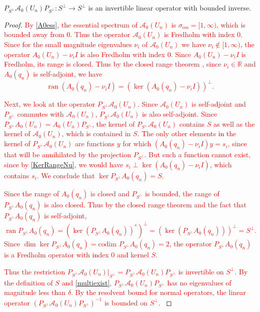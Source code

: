 \documentclass[review,onefignum,onetabnum]{siamart171218}
\newcommand{\R}{\mathbb{R}}
\def\dim{\mathop\mathrm{dim}\nolimits}
\def\ker{\mathop\mathrm{ker}\nolimits}
\def\Ran{\mathop\mathrm{ran}\nolimits}
\newcommand{\calA}{\mathcal{A}}
\newcommand{\revised}[1]{ \textcolor{red}{#1} }
\begin{document}

\begin{lemma}\label{PA0inv}
$P_{S^\perp} \calA_0(U_n) P_{S^\perp}: S^\perp \rightarrow S^\perp$ is an invertible linear operator with bounded inverse.
\end{lemma}

\begin{proof}
\revised{
By \cref{A0ess}, the essential spectrum of $\calA_0(U_n)$ is $\sigma_{\text{ess}} = [1, \infty)$, which is bounded away from 0.
Thus the operator $\calA_0(U_n)$ is Fredholm with index 0. Since for the small magnitude eigenvalues $\nu_i$ of $\calA_0(U_n)$ we have $\nu_i \notin [1, \infty)$, the operator $A_0(U_n)  - \nu_i I$ is also Fredholm with index 0. Since $A_0(U_n)  - \nu_i I$ is Fredholm, its range is closed. Thus by the closed range theorem \cite[p.~205]{Yosida}, since $\nu_i \in \R$ and $A_0(q_n)$ is self-adjoint, we have
\begin{equation}\label{KerRangeNu}
\Ran (A_0(q_n) - \nu_i I) = \left(\ker (A_0(q_n) - \nu_i I)\right)^\perp.
\end{equation}
}

\revised{
Next, we look at the operator $P_{S^\perp} \calA_0(U_n)$. Since $\calA_0(U_n)$ is self-adjoint and $P_{S^\perp}$ commutes with $\calA_0(U_n)$, $P_{S^\perp} \calA_0(U_n)$ is also self-adjoint. Since $P_{S^\perp} A_0(U_n) = A_0(U_n) P_{S^\perp}$, the kernel of $P_{S^\perp} \calA_0(U_n)$ contains $S$ as well as the kernel of $\calA_0(U_n)$, which is contained in $S$. The only other elements in the kernel of $P_{S^\perp} \calA_0(U_n)$ are functions $y$ for which $(A_0(q_n) - \nu_i I) y = s_i$, since that will be annihilated by the projection $P_{S^\perp}$. But such a function cannot exist, since by \eqref{KerRangeNu}, we would have $s_i \perp \ker (A_0(q_n) - \nu_i I)$, which contains $s_i$. We conclude that $\ker P_{S^\perp} A_0(q_n) = S$.
}

\revised{
Since the range of $A_0(q_n)$ is closed and $P_{S^\perp}$ is bounded, the range of $P_{S^\perp} A_0(q_n)$ is also closed. Thus by the closed range theorem and the fact that $P_{S^\perp} A_0(q_n)$ is self-adjoint,
\[
\Ran P_{S^\perp} A_0(q_n) = (\ker (P_{S^\perp} A_0(q_n))^*)^\perp = (\ker (P_{S^\perp} A_0(q_n)))^\perp = S^\perp.
\]
Since $\dim \ker P_{S^\perp} A_0(q_n) = \text{codim } P_{S^\perp} A_0(q_n) = 2$, the operator $P_{S^\perp} A_0(q_n)$ is a Fredholm operator with index 0 and kernel $S$.
}

\revised{
Thus the restriction $P_{S^\perp} \calA_0(U_n)|_{S^\perp} = P_{S^\perp} \calA_0(U_n) P_{S^\perp}$ is invertible on $S^\perp$. By the definition of $S$ and \cref{multiexist}, $P_{S^\perp}\calA_0(U_n)P_{S^\perp}$ has no eigenvalues of magnitude less than $\delta$. By the resolvent bound for normal operators, the linear operator $(P_{S^\perp} \calA_0(U_n)P_{S^\perp})^{-1}$ is bounded on $S^\perp$.
}
\end{proof}
\end{document}
